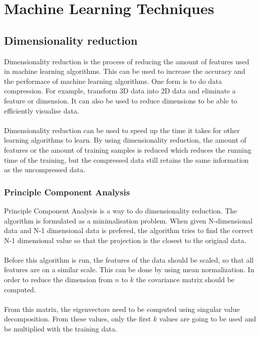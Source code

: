 \chapter{Machine Learning Techniques}

\section{Dimensionality reduction}
Dimensionality reduction is the process of reducing the amount of features used in machine learning algorithms. This can be used to increase the accuracy and the performace of machine learning algorithms. One form is to do data compression. For example, transform 3D data into 2D data and eliminate a feature or dimension. It can also be used to reduce dimensions to be able to efficiently visualise data.\\\\
Dimensionality reduction can be used to speed up the time it takes for other learning algorithms to learn. By using dimensionality reduction, the amount of features or the amount of training samples is reduced which reduces the running time of the training, but the compressed data still retains the same information as the uncompressed data.

\subsection{Principle Component Analysis}
Principle Component Analysis is a way to do dimensionality reduction. The algorithm is formulated as a minimalisation problem. When given N-dimensional data and N-1 dimensional data is prefered, the algorithm tries to find the correct N-1 dimensional value so that the projection is the closest to the original data. \\\\
Before this algorithm is run, the features of the data should be scaled, so that all features are on a similar scale. This can be done by using mean normalization. In order to reduce the dimension from $n$ to $k$ the covariance matrix should be computed. \\\\
From this matrix, the eigenvectors need to be computed using singular value decomposition. From these values, only the first $k$ values are going to be used and be multiplied with the training data.

